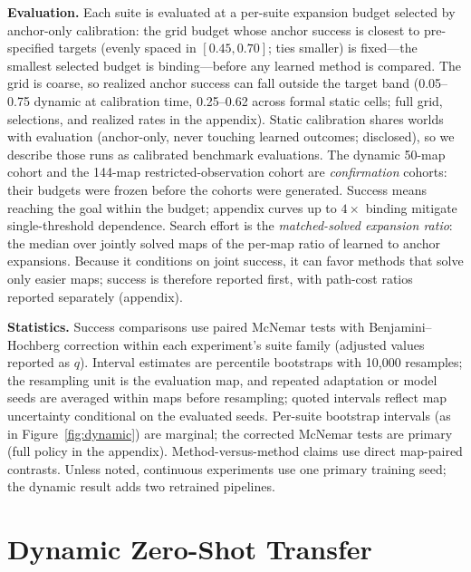 \documentclass[letterpaper]{article} %
\begin{document}
\textbf{Evaluation.} Each suite is evaluated at a per-suite expansion budget selected by anchor-only calibration: the grid budget whose anchor success is closest to pre-specified targets (evenly spaced in $[0.45, 0.70]$; ties smaller) is fixed---the smallest selected budget is binding---before any learned method is compared. The grid is coarse, so realized anchor success can fall outside the target band (0.05--0.75 dynamic at calibration time, 0.25--0.62 across formal static cells; full grid, selections, and realized rates in the appendix). Static calibration shares worlds with evaluation (anchor-only, never touching learned outcomes; disclosed), so we describe those runs as calibrated benchmark evaluations. The dynamic 50-map cohort and the 144-map restricted-observation cohort are \emph{confirmation} cohorts: their budgets were frozen before the cohorts were generated. Success means reaching the goal within the budget; appendix curves up to $4\times$ binding mitigate single-threshold dependence. Search effort is the \emph{matched-solved expansion ratio}: the median over jointly solved maps of the per-map ratio of learned to anchor expansions. Because it conditions on joint success, it can favor methods that solve only easier maps; success is therefore reported first, with path-cost ratios reported separately (appendix).

\textbf{Statistics.} Success comparisons use paired McNemar tests with Benjamini--Hochberg correction within each experiment's suite family (adjusted values reported as $q$). Interval estimates are percentile bootstraps with 10{,}000 resamples; the resampling unit is the evaluation map, and repeated adaptation or model seeds are averaged within maps before resampling; quoted intervals reflect map uncertainty conditional on the evaluated seeds. Per-suite bootstrap intervals (as in Figure~\ref{fig:dynamic}) are marginal; the corrected McNemar tests are primary (full policy in the appendix). Method-versus-method claims use direct map-paired contrasts. Unless noted, continuous experiments use one primary training seed; the dynamic result adds two retrained pipelines.

\section{Dynamic Zero-Shot Transfer}
\end{document}
